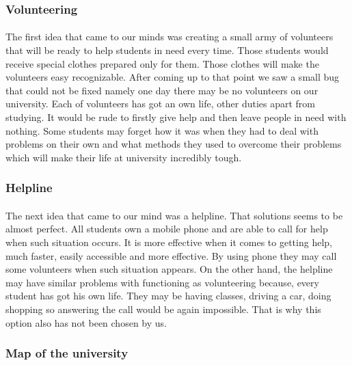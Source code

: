 \documentclass[12pt]{article}
\begin{document}
\subsubsection{Volunteering}
\paragraph{}The first idea that came to our minds was creating a small army of volunteers that will be ready to help students in need every time. Those students would receive special clothes prepared only for them. Those clothes will make the volunteers easy recognizable. After coming up to that point we saw a small bug that could not be fixed namely one day there may be no volunteers on our university. Each of volunteers has got an own life, other duties apart from studying. It would be rude to firstly give help and then leave people in need with nothing. Some students may forget how it was when they had to deal with problems on their own and what methods they used to overcome their problems which will make their life at university incredibly tough.

\subsubsection{Helpline}
\paragraph{}The next idea that came to our mind was a helpline. That solutions seems to be almost perfect. All students own a mobile phone and are able to call for help when such situation occurs. It is more effective when it comes to getting help, much faster, easily accessible and more effective. By using phone they may call some volunteers when such situation appears. On the other hand, the helpline may have similar problems with functioning as volunteering because, every student has got his own life. They may be having classes, driving a car, doing shopping so answering the call would be again impossible. That is why this option also has not been chosen by us. 

\subsubsection{Map of the university}
\end{document}
